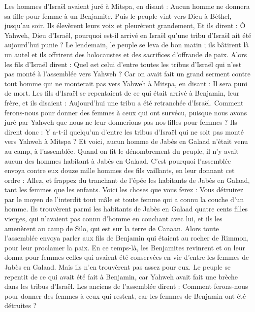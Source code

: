 \begin{multicols}{2}
\VerseOne{}Les hommes d'Israël avaient juré à Mitspa, en disant : Aucun homme ne donnera sa fille pour femme à un Benjamite.
Puis le peuple vint vers Dieu à Béthel, jusqu'au soir. Ils élevèrent leurs voix et pleurèrent grandement,
Et ils dirent : Ô Yahweh, Dieu d'Israël, pourquoi est-il arrivé en Israël qu'une tribu d'Israël ait été aujourd'hui punie ?
Le lendemain, le peuple se leva de bon matin ; ils bâtirent là un autel et ils offrirent des holocaustes et des sacrifices d'offrande de paix.
Alors les fils d'Israël dirent : Quel est celui d'entre toutes les tribus d'Israël qui n'est pas monté à l'assemblée vers Yahweh ? Car on avait fait un grand serment contre tout homme qui ne monterait pas vers Yahweh à Mitspa, en disant : Il sera puni de mort.
Les fils d'Israël se repentaient de ce qui était arrivé à Benjamin, leur frère, et ils disaient : Aujourd'hui une tribu a été retranchée d'Israël.
Comment ferons-nous pour donner des femmes à ceux qui ont survécu, puisque nous avons juré par Yahweh que nous ne leur donnerions pas nos filles pour femmes ?
Ils dirent donc : Y a-t-il quelqu'un d'entre les tribus d'Israël qui ne soit pas monté vers Yahweh à Mitspa ? Et voici, aucun homme de Jabès en Galaad n'était venu au camp, à l'assemblée.
Quand on fit le dénombrement du peuple, il n'y avait aucun des hommes habitant à Jabès en Galaad.
C'est pourquoi l'assemblée envoya contre eux douze mille hommes des fils vaillants, en leur donnant cet ordre : Allez, et frappez du tranchant de l'épée les habitants de Jabès en Galaad, tant les femmes que les enfants.
Voici les choses que vous ferez : Vous détruirez par le moyen de l'interdit tout mâle et toute femme qui a connu la couche d'un homme.
Ils trouvèrent parmi les habitants de Jabès en Galaad quatre cents filles vierges, qui n'avaient pas connu d'homme en couchant avec lui, et ils les amenèrent au camp de Silo, qui est sur la terre de Canaan.
Alors toute l'assemblée envoya parler aux fils de Benjamin qui étaient au rocher de Rimmon, pour leur proclamer la paix.
En ce temps-là, les Benjamites revinrent et on leur donna pour femmes celles qui avaient été conservées en vie d'entre les femmes de Jabès en Galaad. Mais ils n'en trouvèrent pas assez pour eux.
Le peuple se repentit de ce qui avait été fait à Benjamin, car Yahweh avait fait une brèche dans les tribus d'Israël.
Les anciens de l'assemblée dirent : Comment ferons-nous pour donner des femmes à ceux qui restent, car les femmes de Benjamin ont été détruites ?

\end{multicols}
